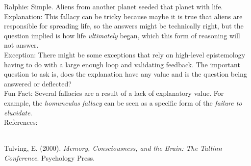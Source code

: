 \documentclass[a4paper,12pt,single,pdftex]{scrartcl}
\begin{document}
    
      Ralphie: Simple.  Aliens from another planet seeded that planet with life.
    \\

    
      Explanation: This fallacy can be tricky because maybe it is true that aliens are responsible for spreading life, so the answers might be technically right, but the question implied is how life {\it ultimately}  began, which this form of reasoning will not answer.
    \\

    
      Exception: There might be some exceptions that rely on high-level epistemology having to do with a large enough loop and validating feedback.  The important question to ask is, does the explanation have any value and is the question being answered or deflected?
    \\

    
      Fun Fact: Several fallacies are a result of a lack of explanatory value. For example, the {\em homunculus fallacy} can be seen as a specific form of the {\it failure to elucidate}.
    \\

    References:

    
      
        
      \\

      
        
          Tulving, E. (2000). {\it Memory, Consciousness, and the Brain: The Tallinn Conference}. Psychology Press.
        
      
    
\end{document}
